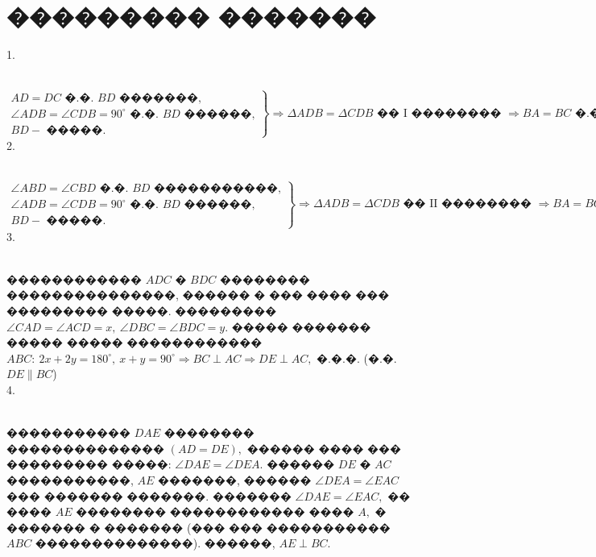 \documentclass[12pt]{article}
\begin{document}
\section{��������� �������}
1. \begin{figure}[ht!]
\end{figure}\\
$\left.\begin{array}{l}AD=DC\text{ �.�. }BD\text{ �������,}\\
\angle ADB=\angle CDB=90^\circ \text{ �.�. }BD\text{ ������,}\\
BD - \text{ �����.}   \end{array}\right\}\Rightarrow
\Delta ADB=\Delta CDB\text{ �� I �������� }\Rightarrow BA=BC\text{ �.�.�.} $\\
2.  \begin{figure}[ht!]
\end{figure}\\
$\left.\begin{array}{l}\angle ABD=\angle CBD\text{ �.�. }BD\text{ �����������,}\\
\angle ADB=\angle CDB=90^\circ \text{ �.�. }BD\text{ ������,}\\
BD - \text{ �����.}   \end{array}\right\}\Rightarrow
\Delta ADB=\Delta CDB\text{ �� II �������� }\Rightarrow BA=BC\text{ �.�.�.} $\\
3. \begin{figure}[ht!]
\end{figure}\\
������������ $ADC$ � $BDC$ �������� ���������������, ������ � ��� ���� ��� ��������� �����. ��������� $\angle CAD=\angle ACD=x,\ \angle DBC=\angle BDC=y.$ ����� ������� ����� ����� ������������ $ABC:\ 2x+2y=180^\circ,\ x+y=90^\circ\Rightarrow BC \perp AC\Rightarrow DE\perp AC,$ �.�.�. (�.�. $DE\parallel BC$)\\
4. \begin{figure}[ht!]
\end{figure}\\
����������� $DAE$ �������� �������������� $(AD=DE),$ ������ ���� ��� ��������� �����: $\angle DAE=\angle DEA.$ ������ $DE$ � $AC$ �����������, $AE$ �������, ������  $\angle DEA=\angle EAC$ ��� ������� �������. ������� $\angle DAE=\angle EAC,$ �� ���� $AE$ �������� ������������ ���� $A,$ � ������� � ������� (��� ��� ����������� $ABC$ ��������������). ������, $AE\perp BC.$\\
\end{document}
